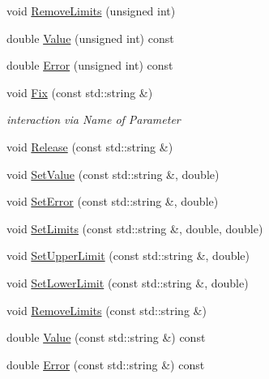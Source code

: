 \begin{DoxyCompactItemize}
\item 
void \mbox{\hyperlink{classROOT_1_1Minuit2_1_1MnUserParameters_a399fd2fff4e1055c0878c8ce24205544}{Remove\+Limits}} (unsigned int)
\item 
double \mbox{\hyperlink{classROOT_1_1Minuit2_1_1MnUserParameters_a5084b0d1312ddb87609ff726a11fd7f6}{Value}} (unsigned int) const
\item 
double \mbox{\hyperlink{classROOT_1_1Minuit2_1_1MnUserParameters_a08122c2515f2f3505ae14a26f7112dcc}{Error}} (unsigned int) const
\item 
void \mbox{\hyperlink{classROOT_1_1Minuit2_1_1MnUserParameters_a2ae09cd0fae9785d4c097439862ab63b}{Fix}} (const std\+::string \&)
\begin{DoxyCompactList}\small\item\em interaction via Name of Parameter \end{DoxyCompactList}\item 
void \mbox{\hyperlink{classROOT_1_1Minuit2_1_1MnUserParameters_ac178a853a9641a88a9a1412224e6e105}{Release}} (const std\+::string \&)
\item 
void \mbox{\hyperlink{classROOT_1_1Minuit2_1_1MnUserParameters_a83c0197f87bd6722f0ddfed4bf406fbe}{Set\+Value}} (const std\+::string \&, double)
\item 
void \mbox{\hyperlink{classROOT_1_1Minuit2_1_1MnUserParameters_aa3d8a9df23458438ccff06800d7c9af2}{Set\+Error}} (const std\+::string \&, double)
\item 
void \mbox{\hyperlink{classROOT_1_1Minuit2_1_1MnUserParameters_a3b22d430f97df8789a8890497c57eed4}{Set\+Limits}} (const std\+::string \&, double, double)
\item 
void \mbox{\hyperlink{classROOT_1_1Minuit2_1_1MnUserParameters_afc550532eeecdcb361f4c707032067e7}{Set\+Upper\+Limit}} (const std\+::string \&, double)
\item 
void \mbox{\hyperlink{classROOT_1_1Minuit2_1_1MnUserParameters_a3423d925b9a4b455c6130fa19f66adb4}{Set\+Lower\+Limit}} (const std\+::string \&, double)
\item 
void \mbox{\hyperlink{classROOT_1_1Minuit2_1_1MnUserParameters_a4aff83aa7fb5e9c0a7edf70f360f68fa}{Remove\+Limits}} (const std\+::string \&)
\item 
double \mbox{\hyperlink{classROOT_1_1Minuit2_1_1MnUserParameters_a4d08de604380552a826ac23ca4978767}{Value}} (const std\+::string \&) const
\item 
double \mbox{\hyperlink{classROOT_1_1Minuit2_1_1MnUserParameters_a52dd385b551b309d26d0dc30581c0b56}{Error}} (const std\+::string \&) const

\end{DoxyCompactItemize}
